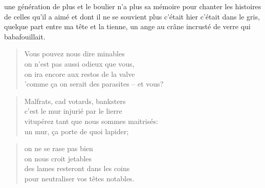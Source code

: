   une génération  de plus et le  boulier n’a plus sa  mémoire pour chanter
  les  histoires de  celles qu’il  a aimé  et dont  il ne  se souvient  plus
  c’était hier  c’était dans le gris,  quelque part entre ma  tête et la
  tienne, un ange au crâne incrusté de verre qui babafouillait.

  \begin{verse}
    Vous pouvez nous dire minables\\
    on n’est pas aussi odieux que vous,\\
    on ira encore aux restos de la valve\\
    ’comme ça on serait des parasites -- et vous?
  \end{verse}
  \begin{verse}
    Malfrats, cad votards, banksters\\
    c’est le mur injurié par le lierre\\
    vitupérez tant que nous sommes maitrisés:\\
    un mur, ça porte de quoi lapider;
  \end{verse}
  \begin{verse}
    on ne se rase pas bien\\
    on nous croit jetables\\
    des lames resteront dans les coins\\
    pour neutraliser vos têtes notables.
  \end{verse}

